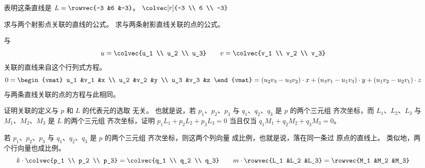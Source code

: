 \begin{exercises}
\begin{answer}
\begin{exparts}
\begin{equation*}
          \end{equation*}
          表明这条直线是 $L=\rowvec{-3 &6 &-3}$。
        \partsitem $\colvec[r]{-3 \\ 6 \\ -3}$
      \end{exparts}
    \end{answer}
  \item
    求与两个射影点关联的直线的公式。
    求与两条射影直线关联的点的公式。
    \begin{answer}
      与
      \begin{equation*}
        u=\colvec{u_1 \\ u_2 \\ u_3}
        \qquad
        v=\colvec{v_1 \\ v_2 \\ v_3}
      \end{equation*}
      关联的直线来自这个行列式方程。
      \begin{equation*}
        0=\begin{vmat}
          u_1  &v_1  &x  \\
          u_2  &v_2  &y  \\
          u_3  &v_3  &z
        \end{vmat}
        =(u_2v_3-u_3v_2)\cdot x 
          + (u_3v_1-u_1v_3)\cdot y 
          + (u_1v_2-u_2v_1)\cdot z
      \end{equation*}
      与两条直线关联的点的方程与此相同。
    \end{answer}
  \item \label{exer:IncidentIndReps}
    证明关联的定义与 $p$ 和 $L$ 的代表元的选取
    无关。
    也就是说，若 $p_1$、$p_2$、$p_3$ 与 $q_1$、$q_2$、$q_3$ 是 $p$ 的两个三元组
    齐次坐标，而
    $L_1$、$L_2$、$L_3$ 与 $M_1$、$M_2$、$M_3$ 是 $L$ 的两个三元组
    齐次坐标，证明
    $p_1L_1+p_2L_2+p_3L_3=0$ 当且仅当
    $q_1M_1+q_2M_2+q_3M_3=0$。
    \begin{answer}
      若 $p_1$、$p_2$、$p_3$ 与 $q_1$、$q_2$、$q_3$ 是 $p$ 的两个三元组
      齐次坐标，则这两个列向量
      成比例，也就是说，落在同一条过
      原点的直线上。
      类似地，两个行向量也成比例。
      \begin{equation*}
        k\cdot\colvec{p_1 \\ p_2 \\ p_3}
          =\colvec{q_1 \\ q_2 \\ q_3}
        \qquad
        m\cdot\rowvec{L_1 &L_2 &L_3}
          =\rowvec{M_1 &M_2 &M_3}

\end{equation*}
\end{answer}
\end{exercises}

